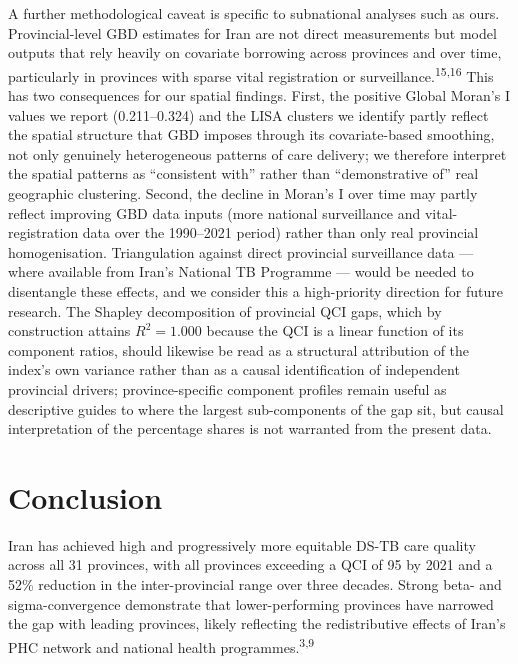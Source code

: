 \documentclass[12pt]{article}
\begin{document}
A further methodological caveat is specific to subnational analyses such as ours. Provincial-level GBD estimates for Iran are not direct measurements but model outputs that rely heavily on covariate borrowing across provinces and over time, particularly in provinces with sparse vital registration or surveillance.\textsuperscript{15,16} This has two consequences for our spatial findings. First, the positive Global Moran's I values we report (0.211--0.324) and the LISA clusters we identify partly reflect the spatial structure that GBD imposes through its covariate-based smoothing, not only genuinely heterogeneous patterns of care delivery; we therefore interpret the spatial patterns as ``consistent with'' rather than ``demonstrative of'' real geographic clustering. Second, the decline in Moran's I over time may partly reflect improving GBD data inputs (more national surveillance and vital-registration data over the 1990--2021 period) rather than only real provincial homogenisation. Triangulation against direct provincial surveillance data --- where available from Iran's National TB Programme --- would be needed to disentangle these effects, and we consider this a high-priority direction for future research. The Shapley decomposition of provincial QCI gaps, which by construction attains $R^2 = 1.000$ because the QCI is a linear function of its component ratios, should likewise be read as a structural attribution of the index's own variance rather than as a causal identification of independent provincial drivers; province-specific component profiles remain useful as descriptive guides to where the largest sub-components of the gap sit, but causal interpretation of the percentage shares is not warranted from the present data.


\section{Conclusion}

Iran has achieved high and progressively more equitable DS-TB care quality across all 31 provinces, with all provinces exceeding a QCI of 95 by 2021 and a 52\% reduction in the inter-provincial range over three decades. Strong beta- and sigma-convergence demonstrate that lower-performing provinces have narrowed the gap with leading provinces, likely reflecting the redistributive effects of Iran's PHC network and national health programmes.\textsuperscript{3,9}
\end{document}
